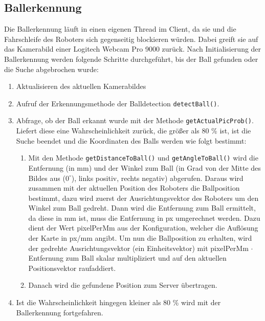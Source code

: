 \subsection{Ballerkennung}

\label{sec:balldetection}
Die Ballerkennung läuft in einen eigenen Thread im Client, da sie und
die Fahrschleife des Roboters sich gegenseitig blockieren
würden. Dabei greift sie auf das Kamerabild einer Logitech Webcam Pro 9000
zurück. Nach Initialisierung der Ballerkennung
werden folgende Schritte durchgeführt, bis der Ball gefunden oder die
Suche abgebrochen wurde:
\begin{enumerate}
\item Aktualisieren des aktuellen Kamerabildes
\item Aufruf der Erkennungsmethode der Balldetection
  \lstinline|detectBall()|. 
\item Abfrage, ob der Ball erkannt wurde mit der Methode
  \lstinline|getActualPicProb()|. Liefert diese eine
  Wahrscheinlichkeit zurück, die größer als 80 \% ist, ist die Suche
  beendet und die Koordinaten des Balls werden wie folgt bestimmt:
  \begin{enumerate}
  \item Mit den Methode \lstinline|getDistanceToBall()| und
    \lstinline|getAngleToBall()| wird die Entfernung (in mm) und der Winkel
    zum Ball (in Grad von der Mitte des Bildes aus ($0^\circ$), links positiv, rechts
		negativ) abgerufen. Daraus wird zusammen mit der aktuellen Position des Roboters
    die Ballposition bestimmt, dazu wird zuerst der Ausrichtungsvektor des
		Roboters um den Winkel zum Ball gedreht. Dann wird die Entfernung zum Ball
		ermittelt, da diese in mm ist, muss die Entfernung in px umgerechnet
		werden. Dazu dient der Wert pixelPerMm aus der Konfiguration, welcher
		die Auflösung der Karte in px/mm angibt. Um nun die Ballposition zu
		erhalten, wird der gedrehte Ausrichtungsvektor (ein Einheitsvektor) mit
		pixelPerMm $\cdot$ Entfernung zum Ball skalar multipliziert und auf den aktuellen
		Positionsvektor raufaddiert.
  \item Danach wird die gefundene Position zum Server übertragen.
  \end{enumerate}
\item Ist die Wahrscheinlichkeit hingegen kleiner als 80 \% wird mit
  der Ballerkennung fortgefahren. 
\end{enumerate}

